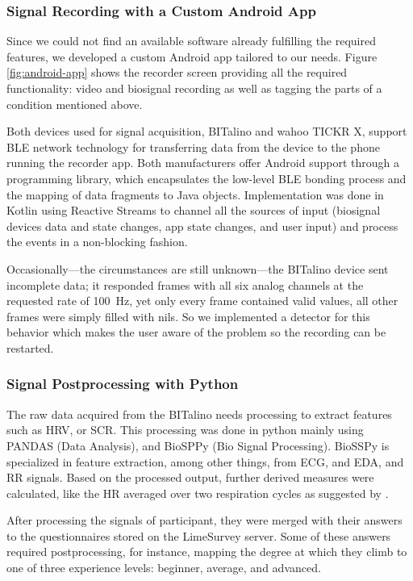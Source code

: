 \subsubsection*{Signal Recording with a Custom Android App}

Since we could not find an available software already fulfilling the required features, we developed a custom Android app tailored to our needs. Figure \ref{fig:android-app} shows the recorder screen providing all the required functionality: video and biosignal recording as well as tagging the parts of a condition mentioned above.



Both devices used for signal acquisition, BITalino and wahoo TICKR X, support \gls{BLE} network technology for transferring data from the device to the phone running the recorder app. Both manufacturers offer Android support through a programming library, which encapsulates the low-level \gls{BLE} bonding process and the mapping of data fragments to Java objects. Implementation was done in Kotlin using Reactive Streams to channel all the sources of input (biosignal devices data and state changes, app state changes, and user input) and process the events in a non-blocking fashion.

Occasionally---the circumstances are still unknown---the BITalino device sent incomplete data; it responded frames with all six analog channels at the requested rate of \SI{100}{\hertz}, yet only every  frame contained valid values, all other frames were simply filled with nils. So we implemented a detector for this behavior which makes the user aware of the problem so the recording can be restarted.

\subsubsection*{Signal Postprocessing with Python}

The raw data acquired from the BITalino needs processing to extract features such as \gls{HRV}, or \gls{SCR}. This processing was done in python mainly using PANDAS (Data Analysis), and BioSPPy (Bio Signal Processing). BioSSPy is specialized in feature extraction, among other things, from \gls{ECG}, and \gls{EDA}, and \gls{RR} signals. Based on the processed output, further derived measures were calculated, like the \gls{HR} averaged over two respiration cycles as suggested by \autocite{Meehan2001}.

After processing the signals of participant, they were merged with their answers to the questionnaires stored on the LimeSurvey server. Some of these answers required postprocessing, for instance, mapping the degree at which they climb to one of three experience levels: beginner, average, and advanced.